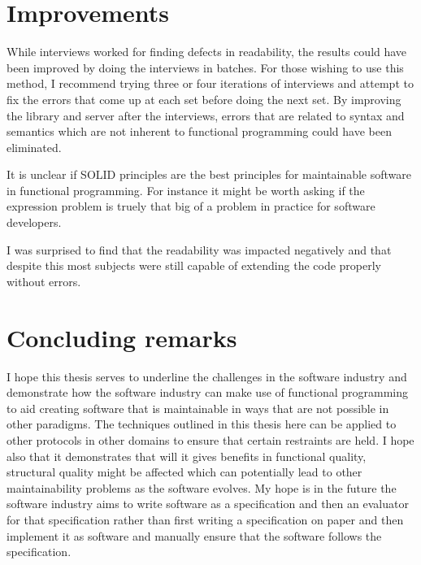 \section{Improvements}

While interviews worked for finding defects in readability, the results could
have been improved by doing the interviews in batches. For those wishing to use
this method, I recommend trying three or four iterations of interviews and
attempt to fix the errors that come up at each set before doing the next set. By
improving the library and server after the interviews, errors that are related
to syntax and semantics which are not inherent to functional programming could
have been eliminated.

It is unclear if SOLID principles are the best principles for maintainable
software in functional programming. For instance it might be worth asking if the
expression problem is truely that big of a problem in practice for software
developers.

I was surprised to find that the readability was impacted negatively and that
despite this most subjects were still capable of extending the code properly
without errors.

\section{Concluding remarks}

I hope this thesis serves to underline the challenges in the software industry
and demonstrate how the software industry can make use of functional programming
to aid creating software that is maintainable in ways that are not possible in
other paradigms. The techniques outlined in this thesis here can be applied to
other protocols in other domains to ensure that certain restraints are held. I
hope also that it demonstrates that will it gives benefits in functional
quality, structural quality might be affected which can potentially lead to
other maintainability problems as the software evolves. My hope is in the future
the software industry aims to write software as a specification and then an
evaluator for that specification rather than first writing a specification on
paper and then implement it as software and manually ensure that the software
follows the specification. 
